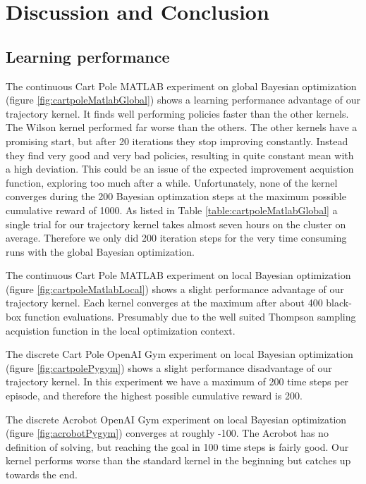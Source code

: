 \chapter{Discussion and Conclusion}
\label{chap:6}

\section{Learning performance}
The continuous Cart Pole MATLAB experiment on global Bayesian optimization (figure \ref{fig:cartpoleMatlabGlobal}) shows a learning performance advantage of our trajectory kernel. It finds well performing policies faster than the other kernels. The Wilson kernel performed far worse than the others. The other kernels have a promising start, but after 20 iterations they stop improving constantly. Instead they find very good and very bad policies, resulting in quite constant mean with a high deviation. This could be an issue of the expected improvement acquistion function, exploring too much after a while. Unfortunately, none of the kernel converges during the 200 Bayesian optimzation steps at the maximum possible cumulative reward of 1000. As listed in Table \ref{table:cartpoleMatlabGlobal} a single trial for our trajectory kernel takes almost seven hours on the cluster on average. Therefore we only did 200 iteration steps for the very time consuming runs with the global Bayesian optimization.

The continuous Cart Pole MATLAB experiment on local Bayesian optimization (figure \ref{fig:cartpoleMatlabLocal}) shows a slight performance advantage of our trajectory kernel. Each kernel converges at the maximum after about 400 black-box function evaluations. Presumably due to the well suited Thompson sampling acquistion function in the local optimization context.

The discrete Cart Pole OpenAI Gym experiment on local Bayesian optimization (figure \ref{fig:cartpolePygym}) shows a slight performance disadvantage of our trajectory kernel. In this experiment we have a maximum of 200 time steps per episode, and therefore the highest possible cumulative reward is 200.

The discrete Acrobot OpenAI Gym experiment on local Bayesian optimization (figure \ref{fig:acrobotPygym}) converges at roughly -100. The Acrobot has no definition of solving, but reaching the goal in 100 time steps is fairly good. Our kernel performs worse than the standard kernel in the beginning but catches up towards the end.

